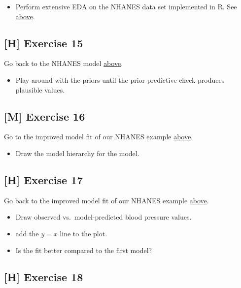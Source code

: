 \documentclass[
]{book}
\providecommand{\tightlist}{%
  \setlength{\itemsep}{0pt}\setlength{\parskip}{0pt}}
\begin{document}
\begin{itemize}
\tightlist
\item
  Perform extensive EDA on the NHANES data set implemented in R.
  See \hyperref[example_nhanes]{above}.
\end{itemize}

\subsection{{[}H{]} Exercise 15}\label{exercise15_multiple_regression}

Go back to the NHANES model \hyperref[prior_predictive_checks_NHANES]{above}.

\begin{itemize}
\tightlist
\item
  Play around with the priors until the prior predictive check produces plausible values.
\end{itemize}

\subsection{{[}M{]} Exercise 16}\label{exercise16_multiple_regression}

Go to the improved model fit of our NHANES example \hyperref[improve_model_NHANES]{above}.

\begin{itemize}
\tightlist
\item
  Draw the model hierarchy for the model.
\end{itemize}

\subsection{{[}H{]} Exercise 17}\label{exercise17_multiple_regression}

Go back to the improved model fit of our NHANES example \hyperref[improve_model_NHANES]{above}.

\begin{itemize}
\tightlist
\item
  Draw observed vs.~model-predicted blood pressure values.
\item
  add the \(y=x\) line to the plot.
\item
  Is the fit better compared to the first model?
\end{itemize}

\subsection{{[}H{]} Exercise 18}\label{exercise18_multiple_regression}
\end{document}

